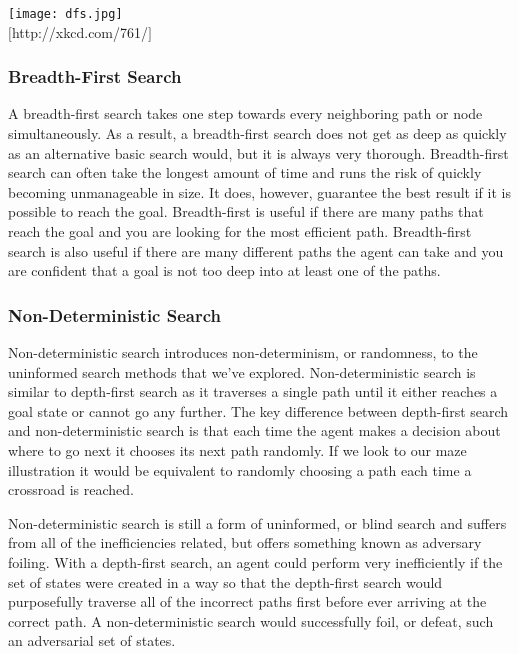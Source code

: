 \documentclass[11pt]{article}
\begin{document}
\begin{center}
\texttt{[image: dfs.jpg]}\\
$[$http://xkcd.com/761/$]$
\end{center}

\subsubsection{Breadth-First Search}
A breadth-first search takes one step towards every
neighboring path or node simultaneously.  As a result, a breadth-first search
does not get as deep as quickly as an alternative basic search would, but it is
always very thorough.  Breadth-first search can often take the longest amount of
time and runs the risk of quickly becoming unmanageable in size.  It does,
however, guarantee the best result if it is possible to reach the goal. 
Breadth-first is useful if there are many paths that reach the goal and you are
looking for the most efficient path.  Breadth-first search is also useful if
there are many different paths the agent can take and you are confident that a
goal is not too deep into at least one of the paths.

\subsubsection{Non-Deterministic Search}
Non-deterministic search introduces non-determinism, or randomness, to the uninformed search methods that we've explored.  Non-deterministic search is similar to depth-first search as it traverses a single path until it either reaches a goal state or cannot go any further.  The key difference between depth-first search and non-deterministic search is that each time the agent makes a decision about where to go next it chooses its next path randomly.  If we look to our maze illustration it would be equivalent to randomly choosing a path each time a crossroad is reached.

Non-deterministic search is still a form of uninformed, or blind search and suffers from all of the inefficiencies related, but offers something known as adversary foiling.  With a depth-first search, an agent could perform very inefficiently if the set of states were created in a way so that the depth-first search would purposefully traverse all of the incorrect paths first before ever arriving at the correct path.  A non-deterministic search would successfully foil, or defeat, such an adversarial set of states.
\end{document}
